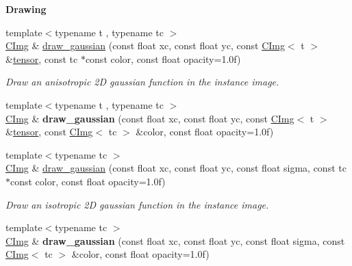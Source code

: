 \begin{Indent}{\bf Drawing}
\begin{DoxyCompactItemize}
\item 
{\footnotesize template$<$typename t , typename tc $>$ }\\\hyperlink{structcimg__library_1_1_c_img}{C\-Img} \& \hyperlink{structcimg__library_1_1_c_img_a3e0fad8de905bdb38b33d863505e4ee5}{draw\-\_\-gaussian} (const float xc, const float yc, const \hyperlink{structcimg__library_1_1_c_img}{C\-Img}$<$ t $>$ \&\hyperlink{structcimg__library_1_1_c_img_a40bd4344f4a7aae588ef5bfa4f8861d1}{tensor}, const tc $\ast$const color, const float opacity=1.\-0f)
\begin{DoxyCompactList}\small\item\em Draw an anisotropic 2\-D gaussian function in the instance image. \end{DoxyCompactList}\item 
\hypertarget{structcimg__library_1_1_c_img_a9299fe0b2a66f31709bc910da0f52b23}{{\footnotesize template$<$typename t , typename tc $>$ }\\\hyperlink{structcimg__library_1_1_c_img}{C\-Img} \& {\bfseries draw\-\_\-gaussian} (const float xc, const float yc, const \hyperlink{structcimg__library_1_1_c_img}{C\-Img}$<$ t $>$ \&\hyperlink{structcimg__library_1_1_c_img_a40bd4344f4a7aae588ef5bfa4f8861d1}{tensor}, const \hyperlink{structcimg__library_1_1_c_img}{C\-Img}$<$ tc $>$ \&color, const float opacity=1.\-0f)}\label{structcimg__library_1_1_c_img_a9299fe0b2a66f31709bc910da0f52b23}

\item 
{\footnotesize template$<$typename tc $>$ }\\\hyperlink{structcimg__library_1_1_c_img}{C\-Img} \& \hyperlink{structcimg__library_1_1_c_img_a11d18cfe9ffdfaae309970762e59c3b2}{draw\-\_\-gaussian} (const float xc, const float yc, const float sigma, const tc $\ast$const color, const float opacity=1.\-0f)
\begin{DoxyCompactList}\small\item\em Draw an isotropic 2\-D gaussian function in the instance image. \end{DoxyCompactList}\item 
\hypertarget{structcimg__library_1_1_c_img_a4cc599f52704e1ad45beca5edc6c6914}{{\footnotesize template$<$typename tc $>$ }\\\hyperlink{structcimg__library_1_1_c_img}{C\-Img} \& {\bfseries draw\-\_\-gaussian} (const float xc, const float yc, const float sigma, const \hyperlink{structcimg__library_1_1_c_img}{C\-Img}$<$ tc $>$ \&color, const float opacity=1.\-0f)}\label{structcimg__library_1_1_c_img_a4cc599f52704e1ad45beca5edc6c6914}


\end{DoxyCompactItemize}
\end{Indent}
